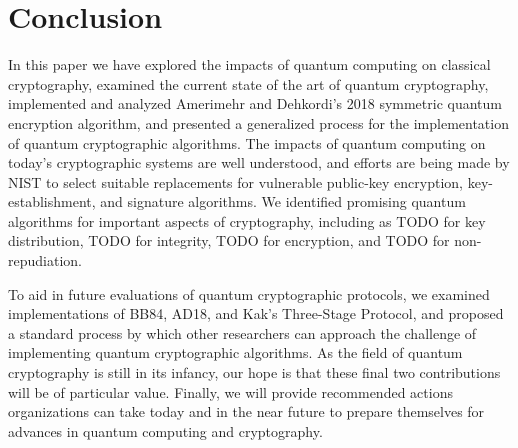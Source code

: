 \documentclass[sigconf]{acmart}
\begin{document}
\section{Conclusion}
In this paper we have explored the impacts of quantum computing on classical cryptography, examined the current state of the art of quantum cryptography, implemented and analyzed Amerimehr and Dehkordi's 2018 symmetric quantum encryption algorithm\cite{amerimehr_quantum_2018}, and presented a generalized process for the implementation of quantum cryptographic algorithms. %
The impacts of quantum computing on today's cryptographic systems are well understood, and efforts are being made by NIST to select suitable replacements for vulnerable public-key encryption, key-establishment, and signature algorithms\cite{moody_nist_2020, csd_postquantum_2017}. We identified promising quantum algorithms for important aspects of cryptography, including as TODO for key distribution, TODO for integrity, TODO for encryption, and TODO for non-repudiation. %

To aid in future evaluations of quantum cryptographic protocols, we examined implementations of BB84, AD18, and Kak's Three-Stage Protocol, and proposed a standard process by which other researchers can approach the challenge of implementing quantum cryptographic algorithms. As the field of quantum cryptography is still in its infancy, our hope is that these final two contributions will be of particular value. Finally, we will provide recommended actions organizations can take today and in the near future to prepare themselves for advances in quantum computing and cryptography.
\end{document}
